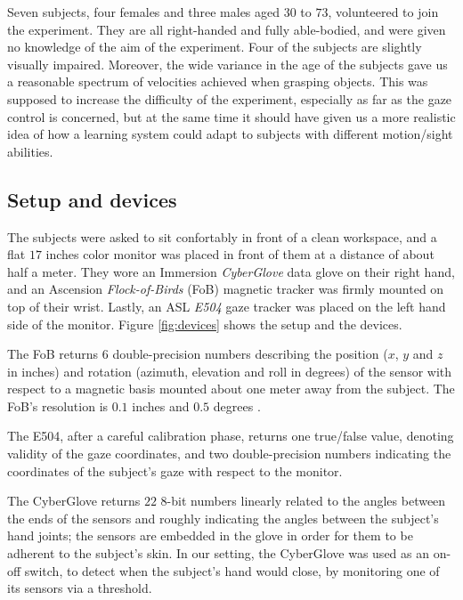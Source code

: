 \documentclass[a4paper,10pt,conference]{ieeeconf}
\begin{document}
Seven subjects, four females and three males aged $30$ to $73$,
volunteered to join the experiment. They are all right-handed and
fully able-bodied, and were given no knowledge of the aim of the
experiment. Four of the subjects are slightly visually
impaired. Moreover, the wide variance in the age of the subjects gave
us a reasonable spectrum of velocities achieved when grasping objects.
This was supposed to increase the difficulty of the experiment,
especially as far as the gaze control is concerned, but at the same
time it should have given us a more realistic idea of how a learning
system could adapt to subjects with different motion/sight abilities.

\subsection{Setup and devices}

The subjects were asked to sit confortably in front of a clean
workspace, and a flat $17$ inches color monitor was placed in front
of them at a distance of about half a meter. They wore an Immersion
\emph{CyberGlove} data glove \cite{cyberglove} on their right hand,
and an Ascension \emph{Flock-of-Birds} (FoB) \cite{fob} magnetic
tracker was firmly mounted on top of their wrist. Lastly, an ASL
\emph{E504} gaze tracker \cite{e504} was placed on the left hand side
of the monitor. Figure \ref{fig:devices} shows the setup and the
devices.

The FoB returns $6$ double-precision numbers describing the position
($x$, $y$ and $z$ in inches) and rotation (azimuth, elevation and roll
in degrees) of the sensor with respect to a magnetic basis mounted
about one meter away from the subject. The FoB's resolution is $0.1$
inches and $0.5$ degrees \cite{fob}.

The E504, after a careful calibration phase, returns one true/false
value, denoting validity of the gaze coordinates, and two
double-precision numbers indicating the coordinates of the subject's
gaze with respect to the monitor.

The CyberGlove returns $22$ $8$-bit numbers linearly related to the
angles between the ends of the sensors and roughly indicating the
angles between the subject's hand joints; the sensors are embedded in
the glove in order for them to be adherent to the subject's skin. In
our setting, the CyberGlove was used as an on-off switch, to detect
when the subject's hand would close, by monitoring one of its sensors
via a threshold.
\end{document}

